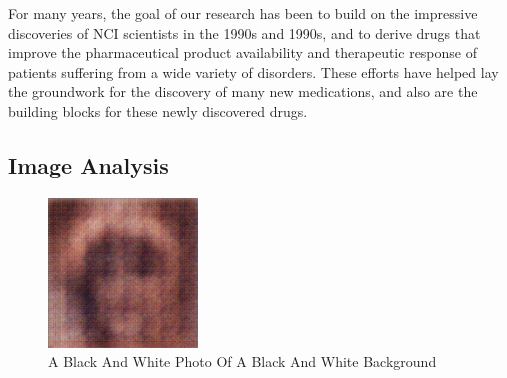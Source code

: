 \documentclass{article}%
\begin{document}
For many years, the goal of our research has been to build on the impressive discoveries of NCI scientists in the 1990s and 1990s, and to derive drugs that improve the pharmaceutical product availability and therapeutic response of patients suffering from a wide variety of disorders. These efforts have helped lay the groundwork for the discovery of many new medications, and also are the building blocks for these newly discovered drugs.

%
\subsection{Image Analysis}%
\label{subsec:ImageAnalysis}%


\begin{figure}[h!]%
\centering%
\includegraphics[width=150px]{500_fake_images/samples_5_280.png}%
\caption{A Black And White Photo Of A Black And White Background}%
\end{figure}

%
\end{document}
